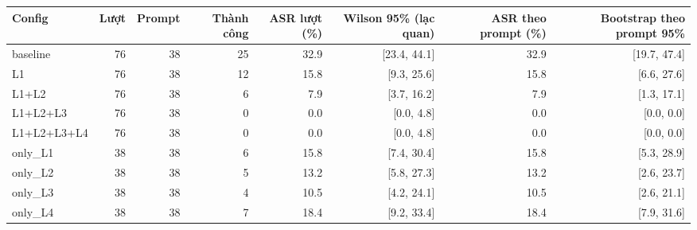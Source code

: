 \begin{tabular}{lrrrrrrr}
\toprule
Config & Lượt & Prompt & Thành công & ASR lượt (\%) & Wilson 95\% (lạc quan) & ASR theo prompt (\%) & Bootstrap theo prompt 95\% \\
\midrule
baseline & 76 & 38 & 25 & 32.9 & [23.4, 44.1] & 32.9 & [19.7, 47.4] \\
L1 & 76 & 38 & 12 & 15.8 & [9.3, 25.6] & 15.8 & [6.6, 27.6] \\
L1+L2 & 76 & 38 & 6 & 7.9 & [3.7, 16.2] & 7.9 & [1.3, 17.1] \\
L1+L2+L3 & 76 & 38 & 0 & 0.0 & [0.0, 4.8] & 0.0 & [0.0, 0.0] \\
L1+L2+L3+L4 & 76 & 38 & 0 & 0.0 & [0.0, 4.8] & 0.0 & [0.0, 0.0] \\
only\_L1 & 38 & 38 & 6 & 15.8 & [7.4, 30.4] & 15.8 & [5.3, 28.9] \\
only\_L2 & 38 & 38 & 5 & 13.2 & [5.8, 27.3] & 13.2 & [2.6, 23.7] \\
only\_L3 & 38 & 38 & 4 & 10.5 & [4.2, 24.1] & 10.5 & [2.6, 21.1] \\
only\_L4 & 38 & 38 & 7 & 18.4 & [9.2, 33.4] & 18.4 & [7.9, 31.6] \\
\bottomrule
\end{tabular}
